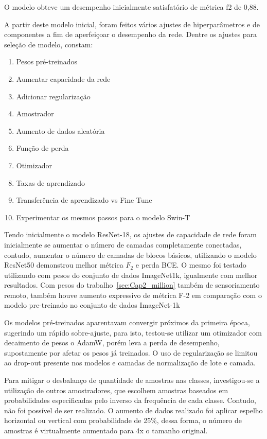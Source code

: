 O modelo obteve um desempenho inicialmente satisfatório de métrica f2 de 0,88.

A partir deste modelo inicial, foram feitos vários ajustes de hiperparâmetros e de componentes a fim de aperfeiçoar o desempenho da rede. Dentre os ajustes para seleção de modelo, constam:


\begin{enumerate}
    \item Pesos pré-treinados
    \item Aumentar capacidade da rede
    \item Adicionar regularização 
    \item Amostrador
    \item Aumento de dados aleatória
    \item Função de perda
    \item Otimizador
    \item Taxas de aprendizado
    \item Transferência de aprendizado vs Fine Tune
    \item Experimentar os mesmos passos para o modelo Swin-T
\end{enumerate}

Tendo inicialmente o modelo ResNet-18, os ajustes de capacidade de rede foram inicialmente se aumentar o número de camadas completamente conectadas, contudo, aumentar o número de camadas de blocos básicos, utilizando o modelo ResNet50 demonstrou melhor métrica $F_2$ e perda BCE. O mesmo foi testado utilizando com pesos do conjunto de dados ImageNet1k, igualmente com melhor resultados. Com pesos do trabalho~\ref{sec:Cap2_million} também de sensoriamento remoto, também houve aumento expressivo de métrica F-2 em comparação com o modelo pre-treinado no conjunto de dados ImageNet-1k

Os modelos pré-treinados aparentavam convergir próximos da primeira época, sugerindo um rápido sobre-ajuste, para isto, testou-se utilizar um otimizador com decaimento de pesos o AdamW, porém leva a perda de desempenho, supostamente por afetar os pesos já treinados. O uso de regularização se limitou ao drop-out presente nos modelos e camadas de normalização de lote e camada.

Para mitigar o desbalanço de quantidade de amostras nas classes, investigou-se a utilização de outros amostradores, que escolhem amostras baseados em probabilidades especificadas pelo inverso da frequência de cada classe. Contudo, não foi possível de ser realizado. O aumento de dados realizado foi aplicar espelho horizontal ou vertical com probabilidade de 25\%, dessa forma, o número de amostras é virtualmente aumentado para 4x o tamanho original.

